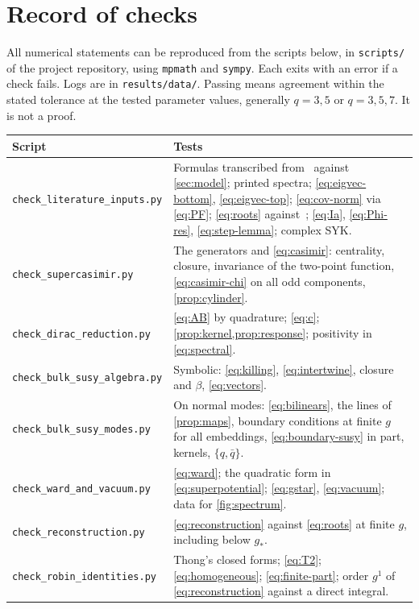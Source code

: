 \section{Record of checks}
\label{app:checks}

All numerical statements can be reproduced from the scripts below, in \texttt{scripts/} of the project repository, using \texttt{mpmath} and \texttt{sympy}. Each exits with an error if a check fails. Logs are in \texttt{results/data/}. Passing means agreement within the stated tolerance at the tested parameter values, generally $q=3,5$ or $q=3,5,7$. It is not a proof.

{\small\renewcommand{\arraystretch}{1.25}
\begin{longtable}{@{}p{}p{}@{}}
\toprule
Script & Tests\\
\midrule
\endhead
\texttt{check\_literature\_inputs.py} & Formulas transcribed from~\cite{Peng:2017spg,Bulycheva:2018qcp,Fu:2016vas,Maldacena:2016hyu} against \cref{sec:model}; printed spectra; \eqref{eq:eigvec-bottom}, \eqref{eq:eigvec-top}; \eqref{eq:cov-norm} via \eqref{eq:PF}; \eqref{eq:roots} against~\cite{Peng:2017spg}; \eqref{eq:Ia}, \eqref{eq:Phi-res}, \eqref{eq:step-lemma}; complex SYK.\\
\texttt{check\_supercasimir.py} & The generators and \eqref{eq:casimir}: centrality, closure, invariance of the two-point function, \eqref{eq:casimir-chi} on all odd components, \cref{prop:cylinder}.\\
\texttt{check\_dirac\_reduction.py} & \eqref{eq:AB} by quadrature; \eqref{eq:c}; \cref{prop:kernel,prop:response}; positivity in \eqref{eq:spectral}.\\
\texttt{check\_bulk\_susy\_algebra.py} & Symbolic: \eqref{eq:killing}, \eqref{eq:intertwine}, closure and $\beta$, \eqref{eq:vectors}.\\
\texttt{check\_bulk\_susy\_modes.py} & On normal modes: \eqref{eq:bilinears}, the lines of \cref{prop:maps}, boundary conditions at finite $g$ for all embeddings, \eqref{eq:boundary-susy} in part, kernels, $\{q,\bar q\}$.\\
\texttt{check\_ward\_and\_vacuum.py} & \eqref{eq:ward}; the quadratic form in \eqref{eq:superpotential}; \eqref{eq:gstar}, \eqref{eq:vacuum}; data for \cref{fig:spectrum}.\\
\texttt{check\_reconstruction.py} & \eqref{eq:reconstruction} against \eqref{eq:roots} at finite $g$, including below $g_*$.\\
\texttt{check\_robin\_identities.py} & Thong's closed forms; \eqref{eq:T2}; \eqref{eq:homogeneous}; \eqref{eq:finite-part}; order $g^1$ of \eqref{eq:reconstruction} against a direct integral.\\

\end{longtable}}
